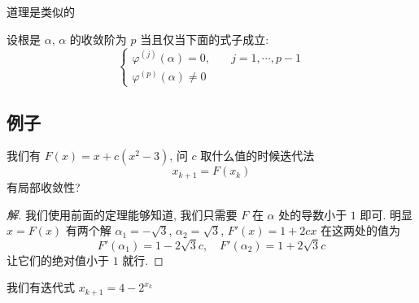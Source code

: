 \begin{frame}
	\begin{thm}[局部收敛性]
		道理是类似的
	\end{thm}
	\begin{thm}[重根]
		设根是 \(\alpha\), \(\alpha\) 的收敛阶为 \(p\) 当且仅当下面的式子成立:
		\[
			\begin{cases}
			\varphi^{(j)} (\alpha) = 0 , \quad & j = 1 , \cdots , p - 1 \\
			\varphi ^{(p)} (\alpha) \ne 0
			\end{cases}
		\]
	\end{thm}
\end{frame}

\subsection{例子}
\begin{frame}
我们有 \(F (x) = x + c ( x^{2} - 3)\), 问 \(c\) 取什么值的时候迭代法 \[x_{k+1} = F (x_{k}) \] 有局部收敛性?
\begin{proof}[解]
我们使用前面的定理能够知道, 我们只需要 \(F\) 在 \(\alpha\) 处的导数小于 \(1\) 即可. 明显 \(x = F(x)\) 有两个解 \(\alpha _{1} = - \sqrt 3\), \(\alpha _{2} = \sqrt 3\), \(F ' (x) = 1 + 2 cx\) 在这两处的值为
\[
F'(\alpha_1) = 1 - 2 \sqrt 3 c , \quad F '(\alpha_{2})  = 1  + 2 \sqrt 3 c
\]
让它们的绝对值小于 \(1\) 就行.
\end{proof}
\end{frame}

\begin{frame}
我们有迭代式 \( x_{k+1} = 4 - 2 ^{x_{k}}\)
\end{frame}
